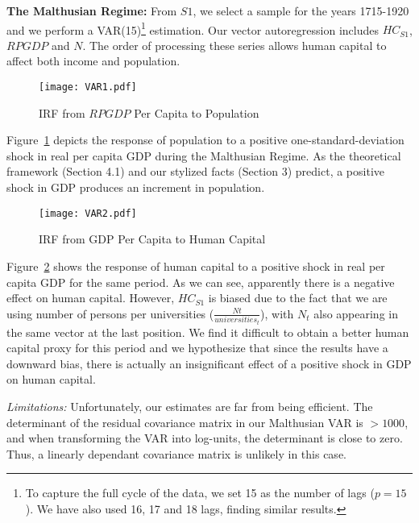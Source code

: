 \documentclass[12pt]{article}%
\begin{document}
\textbf{The Malthusian Regime:} From $S1$, we select a sample for the years 1715-1920 and we perform a VAR(15)\footnote{To capture the full cycle of the data, we set 15 as the number of lags ($p=15$). We have also used 16, 17 and 18 lags, finding similar results.} estimation. Our vector autoregression includes $HC_{S1}$, $RPGDP$ and $N$. The order of processing these series allows human capital to affect both income and population.
\begin{figure}[h]
\caption{IRF from $RPGDP$ Per Capita to Population}
\centering
\texttt{[image: VAR1.pdf]} \\
\footnotesize
\label{VAR1}
\end{figure}
Figure~\ref{VAR1} depicts the response of population to a positive one-standard-deviation shock in real per capita GDP during the Malthusian Regime. As the theoretical framework (Section 4.1) and our stylized facts (Section 3) predict, a positive shock in GDP produces an increment in population.
\begin{figure}[h]
\caption{IRF from GDP Per Capita to Human Capital}
\centering
\texttt{[image: VAR2.pdf]} \\
\footnotesize
\label{VAR2}
\end{figure}
Figure~\ref{VAR2} shows the response of human capital to a positive shock in real per capita GDP for the same period. As we can see, apparently there is a negative effect on human capital. However, $HC_{S1}$ is biased due to the fact that we are using number of persons per universities ($\frac{N{t}}{universities_{t}}$), with $N_{t}$ also appearing in the same vector at the last position. We find it difficult to obtain a better human capital proxy for this period and we hypothesize that since the results have a downward bias, there is actually an insignificant effect of a positive shock in GDP on human capital.

\emph{Limitations:} Unfortunately, our estimates are far from being efficient. The determinant of the residual covariance matrix in our Malthusian VAR is $>1000$, and when transforming the VAR into log-units, the determinant is close to zero. Thus, a linearly dependant covariance matrix is unlikely in this case.
\end{document}
